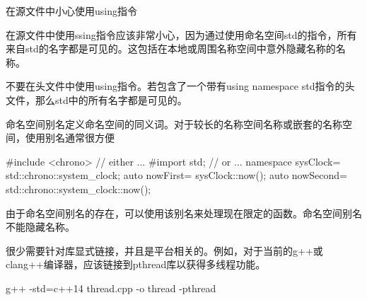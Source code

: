 \begin{myWarning}{在源文件中小心使用using指令}

在源文件中使用ssing指令应该非常小心，因为通过使用命名空间std的指令，所有来自std的名字都是可见的。这包括在本地或周围名称空间中意外隐藏名称的名称。

不要在头文件中使用using指令。若包含了一个带有using namespace std指令的头文件，那么std中的所有名字都是可见的。

\end{myWarning}


命名空间别名定义命名空间的同义词。对于较长的名称空间名称或嵌套的名称空间，使用别名通常很方便

\begin{cpp}
#include <chrono> // either
...
#import std; // or
...
namespace sysClock= std::chrono::system_clock;
auto nowFirst= sysClock::now();
auto nowSecond= std::chrono::system_clock::now();
\end{cpp}

由于命名空间别名的存在，可以使用该别名来处理现在限定的函数。命名空间别名不能隐藏名称。



很少需要针对库显式链接，并且是平台相关的。例如，对于当前的g++或clang++编译器，应该链接到pthread库以获得多线程功能。

\begin{shell}
g++ -std=c++14 thread.cpp -o thread -pthread
\end{shell}